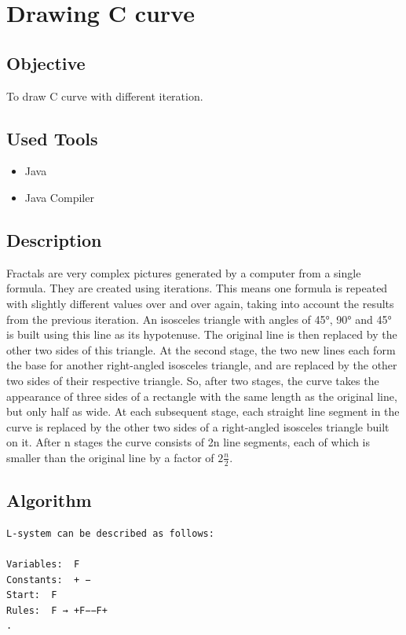 \documentclass[11pt]{report}
\begin{document}
\chapter{Drawing C curve}
\section{Objective}
To draw C curve with different iteration.
\section{Used Tools}
\begin{itemize}
	\item Java
	\item Java Compiler
\end{itemize}

\section{Description}
Fractals are very complex pictures generated by a computer from a single formula. They are created using iterations. This means one formula is repeated with slightly different values over and over again, taking into account the results from the previous iteration. An isosceles triangle with angles of 45°, 90° and 45° is built using this line as its hypotenuse. The original line is then replaced by the other two sides of this triangle. At the second stage, the two new lines each form the base for another right-angled isosceles triangle, and are replaced by the other two sides of their respective triangle. So, after two stages, the curve takes the appearance of three sides of a rectangle with the same length as the original line, but only half as wide. At each subsequent stage, each straight line segment in the curve is replaced by the other two sides of a right-angled isosceles triangle built on it. After n stages the curve consists of 2n line segments, each of which is smaller than the original line by a factor of $2\frac{n}{2}$.

\section{Algorithm}
\begin{lstlisting}
L-system can be described as follows:

Variables:	F
Constants:	+ −
Start:	F
Rules:	F → +F−−F+
.
\end{lstlisting}
\end{document}
